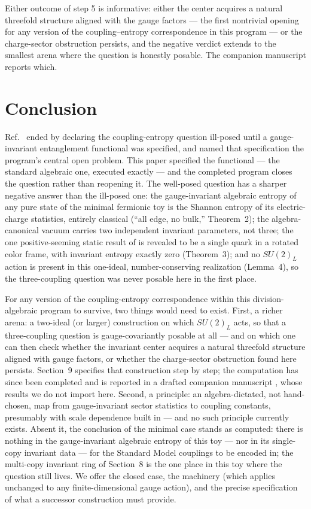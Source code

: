 \documentclass[11pt]{article}
\begin{document}
Either outcome of step 5 is informative: either the center acquires a natural threefold structure aligned with the gauge factors --- the first nontrivial opening for any version of the coupling--entropy correspondence in this program --- or the charge-sector obstruction persists, and the negative verdict extends to the smallest arena where the question is honestly posable. The companion manuscript \cite{twoideal} reports which.

\section{Conclusion}

Ref.~\cite{companion} ended by declaring the coupling-entropy question ill-posed until a gauge-invariant entanglement functional was specified, and named that specification the program's central open problem. This paper specified the functional --- the standard algebraic one, executed exactly --- and the completed program closes the question rather than reopening it. The well-posed question has a sharper negative answer than the ill-posed one: the gauge-invariant algebraic entropy of any pure state of the minimal fermionic toy is the Shannon entropy of its electric-charge statistics, entirely classical (``all edge, no bulk,'' Theorem~2); the algebra-canonical vacuum carries two independent invariant parameters, not three; the one positive-seeming static result of \cite{companion} is revealed to be a single quark in a rotated color frame, with invariant entropy exactly zero (Theorem~3); and no $SU(2)_L$ action is present in this one-ideal, number-conserving realization (Lemma~4), so the three-coupling question was never posable here in the first place.

For any version of the coupling-entropy correspondence within this division-algebraic program to survive, two things would need to exist. First, a richer arena: a two-ideal (or larger) construction on which $SU(2)_L$ acts, so that a three-coupling question is gauge-covariantly posable at all --- and on which one can then check whether the invariant center acquires a natural threefold structure aligned with gauge factors, or whether the charge-sector obstruction found here persists. Section~9 specifies that construction step by step; the computation has since been completed and is reported in a drafted companion manuscript \cite{twoideal}, whose results we do not import here. Second, a principle: an algebra-dictated, not hand-chosen, map from gauge-invariant sector statistics to coupling constants, presumably with scale dependence built in --- and no such principle currently exists. Absent it, the conclusion of the minimal case stands as computed: there is nothing in the gauge-invariant algebraic entropy of this toy --- nor in its single-copy invariant data --- for the Standard Model couplings to be encoded in; the multi-copy invariant ring of Section~8 is the one place in this toy where the question still lives. We offer the closed case, the machinery (which applies unchanged to any finite-dimensional gauge action), and the precise specification of what a successor construction must provide.
\end{document}
